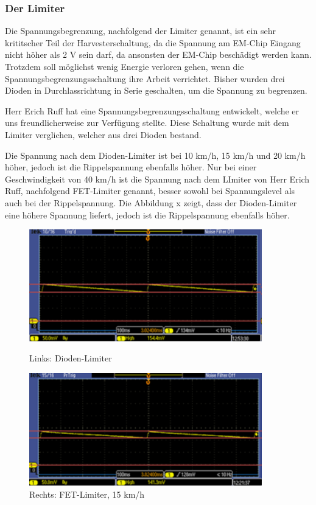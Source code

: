 \subsubsection{Der Limiter}

Die Spannungsbegrenzung, nachfolgend der Limiter genannt, ist ein sehr krititscher Teil der Harvesterschaltung, da die Spannung am EM-Chip Eingang nicht höher als 2 V sein darf, da ansonsten der EM-Chip beschädigt werden kann. Trotzdem soll möglichst wenig Energie verloren gehen, wenn die Spannungsbegrenzungsschaltung ihre Arbeit verrichtet. Bisher wurden drei Dioden in Durchlassrichtung in Serie geschalten, um die Spannung zu begrenzen.

Herr Erich Ruff hat eine Spannungsbegrenzungsschaltung entwickelt, welche er uns freundlicherweise zur Verfügung stellte. Diese Schaltung wurde mit dem Limiter verglichen, welcher aus drei Dioden bestand.

Die Spannung nach dem Dioden-Limiter ist bei 10 km/h, 15 km/h und 20 km/h höher, jedoch ist die Rippelspannung ebenfalls höher. Nur bei einer Geschwindigkeit von 40 km/h ist die Spannung nach dem LImiter von Herr Erich Ruff, nachfolgend FET-Limiter genannt, besser sowohl bei Spannungslevel als auch bei der Rippelspannung. Die Abbildung x zeigt, dass der Dioden-Limiter eine höhere Spannung liefert, jedoch ist die Rippelspannung ebenfalls höher.

\begin{figure}[ht]
 \begin{minipage}[t]{0.5\textwidth}
    \includegraphics[width=0.9\textwidth]{3Vorgehen/imag/Messung_Optimierung_Limiter_links.png}
    \caption{Links: Dioden-Limiter}
    \label{messung_optimierung_limiter} 
 \end{minipage}
 \begin{minipage}[t]{0.5\textwidth}
    \includegraphics[width=0.9\textwidth]{3Vorgehen/imag/Messung_Optimierung_Limiter_rechts.png}
    \caption{Rechts: FET-Limiter, 15 km/h}
 \end{minipage}
\end{figure}

